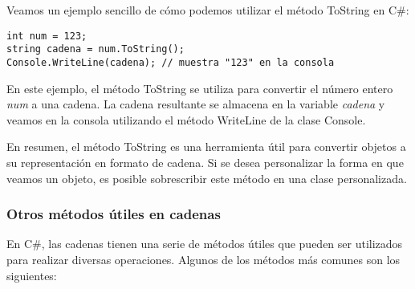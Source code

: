 \documentclass[executivepaper]{article}
\begin{document}
Veamos un ejemplo sencillo de cómo podemos utilizar el método ToString en C\#:

\begin{lstlisting}
int num = 123;
string cadena = num.ToString();
Console.WriteLine(cadena); // muestra "123" en la consola
\end{lstlisting}

En este ejemplo, el método ToString se utiliza para convertir el número entero \emph{num} a una cadena. La cadena resultante se almacena en la variable \emph{cadena} y veamos en la consola utilizando el método WriteLine de la clase Console.

En resumen, el método ToString es una herramienta útil para convertir objetos a su representación en formato de cadena. Si se desea personalizar la forma en que veamos un objeto, es posible sobrescribir este método en una clase personalizada.

\subsubsection*{Otros métodos útiles en cadenas}

En C\#, las cadenas tienen una serie de métodos útiles que pueden ser utilizados para realizar diversas operaciones. Algunos de los métodos más comunes son los siguientes:
\end{document}
